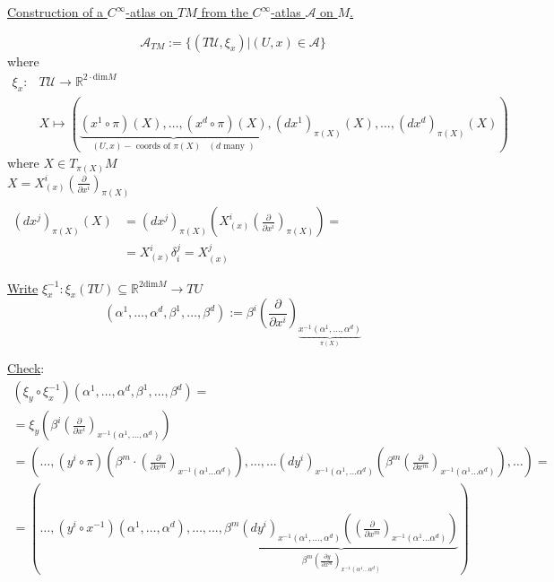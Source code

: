 \documentclass[10pt]{amsart}
\begin{document}
\begin{multicols*}{2}
\begin{enumerate}
		\underline{Construction of a $C^{\infty}$-atlas on $TM$ from the $C^{\infty}$-atlas $\mathcal{A}$ on $M$. }
		
		\[
		\mathcal{A}_{TM} := \lbrace (T\mathcal{U},\xi_x  ) | (U,x) \in \mathcal{A} \rbrace
		\]
		where
		\[
		\begin{aligned}
		\xi_x : & T \mathcal{U} \to \mathbb{R}^{2\cdot\text{dim}  M } \\
		& X \mapsto (\underbrace{ (x^1 \circ \pi)(X), \dots, (x^d\circ \pi)(X) }_{(U,x)-\text{ coords of $\pi(X)$ } \, (d \text{ many } ) } , (dx^1)_{\pi(X)}(X), \dots , (dx^d)_{\pi(X)}(X)  )
		\end{aligned}
		\]
		where $X\in T_{\pi(X)}M$ \\
		\phantom{where } $X = X_{(x)}^i \left( \frac{ \partial }{ \partial x^i} \right)_{\pi(X)}$  \\
		\phantom{where } $\begin{aligned} \quad  & \\
		(dx^j)_{\pi(X)}(X) &= (dx^j)_{\pi(X)} \left( X^i_{(x)}\left( \frac{ \partial }{ \partial x^i} \right)_{\pi(X)} \right) = \\
		& = X^i_{(x)}\delta_i^j = X^j_{(x)}\end{aligned}$
		
		\underline{Write} $\xi_x^{-1} : \xi_x(TU) \subseteq \mathbb{R}^{2\text{dim}M} \to TU$
		\[
		(\alpha^1 , \dots , \alpha^d, \beta^1, \dots , \beta^d) := \beta^i \left( \frac{ \partial }{ \partial x^i} \right)_{ \underbrace{ x^{-1}(\alpha^1 , \dots , \alpha^d) }_{\pi(X)} }
		\]
		
		\underline{Check}: \[
		\begin{gathered}
		(\xi_y \circ \xi_x^{-1})(\alpha^1 , \dots , \alpha^d, \beta^1, \dots , \beta^d) = \\
		= \xi_y \left( \beta^i \left( \frac{ \partial }{ \partial x^i} \right)_{x^{-1}(\alpha^1 , \dots , \alpha^d) } \right) \\
		= \left( \dots, (y^i \circ \pi)( \beta^m \cdot \left( \frac{ \partial }{ \partial x^m} \right)_{x^{-1}(\alpha^1 \dots \alpha^d) } )  , \dots , \dots (dy^i)_{x^{-1}(\alpha^1, \dots \alpha^d) } \left( \beta^m \left( \frac{ \partial }{ \partial x^m} \right)_{x^{-1}(\alpha^1 \dots \alpha^d) } \right) , \dots   \right) = \\
		= ( \dots , (y^i \circ x^{-1})(\alpha^1 , \dots , \alpha^d), \dots , \dots , \underbrace{ \beta^m(dy^i)_{x^{-1} (\alpha^1, \dots , \alpha^d) } \left( \left( \frac{ \partial }{ \partial x^m} \right)_{x^{-1}(\alpha^1 \dots \alpha^d) } \right)}_{ \beta^m \left( \frac{ \partial y }{ \partial x^m } \right)_{x^{-1}(\alpha^1 \dots \alpha^d)} }  ) 
		\end{gathered}
		\]
		

\end{enumerate}
\end{multicols*}
\end{document}
